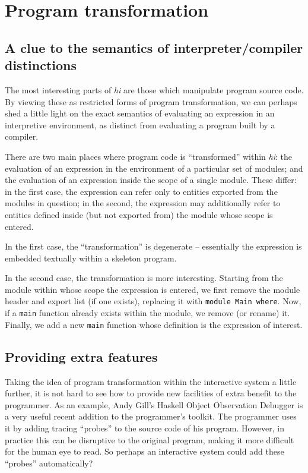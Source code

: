 \documentclass[a4paper]{llncs}
\begin{document}
\section{Program transformation}
\subsection{A clue to the semantics of interpreter/compiler distinctions}

The most interesting parts of {\em hi} are those which manipulate
program source code.  By viewing these as restricted forms of program
transformation, we can perhaps shed a little light on the exact
semantics of evaluating an expression in an interpretive environment,
as distinct from evaluating a program built by a compiler.

There are two main places where program code is ``transformed''
within {\em hi}: the evaluation of an expression in the environment
of a particular set of modules; and the evaluation of an expression
inside the scope of a single module.  These differ: in the first case,
the expression can refer only to entities exported from the modules
in question; in the second, the expression may additionally refer
to entities defined inside (but not exported from) the module whose
scope is entered.

In the first case, the ``transformation'' is degenerate -- essentially
the expression is embedded textually within a skeleton program.

In the second case, the transformation is more interesting.  Starting
from the module within whose scope the expression is entered, we first
remove the module header and export list (if one exists), replacing it
with {\tt module Main where}.  Now, if a {\tt main} function already
exists within the module, we remove (or rename) it.  Finally, we add a
new {\tt main} function whose definition is the expression of interest.


\subsection{Providing extra features}

Taking the idea of program transformation within the interactive
system a little further, it is not hard to see how to provide new
facilities of extra benefit to the programmer.  As an example, Andy
Gill's Haskell Object Observation Debugger is a very useful recent
addition to the programmer's toolkit.  The programmer uses it by
adding tracing ``probes'' to the source code of his program.  However,
in practice this can be disruptive to the original program, making it more
difficult for the human eye to read.  So perhaps an interactive system
could add these ``probes'' automatically?
\end{document}
